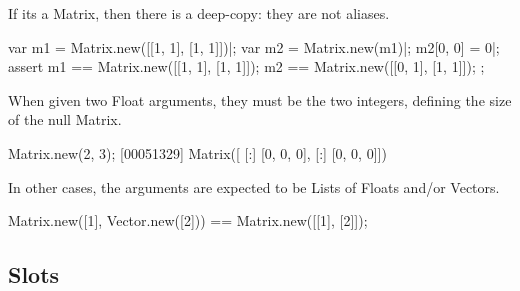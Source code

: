 If its a Matrix, then there is a deep-copy: they are not aliases.

\begin{urbiscript}
var m1 = Matrix.new([[1, 1], [1, 1]])|;
var m2 = Matrix.new(m1)|;
m2[0, 0] = 0|;
assert
{
  m1 == Matrix.new([[1, 1], [1, 1]]);
  m2 == Matrix.new([[0, 1], [1, 1]]);
};
\end{urbiscript}

When given two Float arguments, they must be the two integers, defining the
size of the null Matrix.
\begin{urbiscript}
Matrix.new(2, 3);
[00051329] Matrix([
[:]  [0, 0, 0],
[:]  [0, 0, 0]])
\end{urbiscript}

In other cases, the arguments are expected to be Lists of Floats and/or
Vectors.

\begin{urbiassert}
Matrix.new([1], Vector.new([2])) == Matrix.new([[1], [2]]);
\end{urbiassert}

\subsection{Slots}

